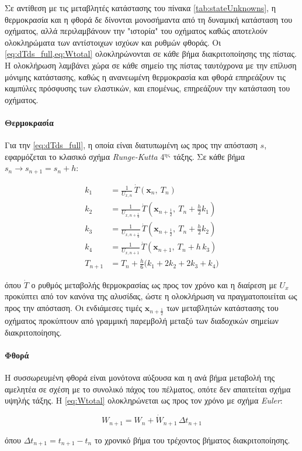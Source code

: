 Σε αντίθεση με τις μεταβλητές κατάστασης του πίνακα \ref{tab:stateUnknowns}, η θερμοκρασία και η φθορά δε δίνονται μονοσήμαντα από τη δυναμική κατάσταση του οχήματος, αλλά περιλαμβάνουν την "ιστορία" του οχήματος καθώς αποτελούν ολοκληρώματα των αντίστοιχων ισχύων και ρυθμών φθοράς. Οι \cref{eq:dTds_full,eq:Wtotal} ολοκληρώνονται σε κάθε βήμα διακριτοποίησης της πίστας. Η ολοκλήρωση λαμβάνει χώρα σε κάθε σημείο της πίστας ταυτόχρονα με την επίλυση μόνιμης κατάστασης, καθώς η ανανεωμένη θερμοκρασία και φθορά επηρεάζουν τις καμπύλες πρόσφυσης των ελαστικών, και επομένως, επηρεάζουν την κατάσταση του οχήματος.

\paragraph{Θερμοκρασία}
Για την \cref{eq:dTds_full}, η οποία είναι διατυπωμένη ως προς την απόσταση $s$, εφαρμόζεται το κλασικό σχήμα \textit{Runge-Kutta} 4$^{\text{ης}}$ τάξης. Σε κάθε βήμα $s_n \rightarrow s_{n+1} = s_n + h$:

\begin{equation}
    \begin{aligned}
        k_1 &= \frac{1}{U_{x,n}}\,\dot{T}\!\left(\mathbf{x}_n,\ T_n\right)\\[2pt]
        k_2 &= \frac{1}{U_{x,n+\frac{1}{2}}}\,\dot{T}\!\left(\mathbf{x}_{n+\frac{1}{2}},\ T_n + \tfrac{h}{2}k_1\right)\\[2pt]
        k_3 &= \frac{1}{U_{x,n+\frac{1}{2}}}\,\dot{T}\!\left(\mathbf{x}_{n+\frac{1}{2}},\ T_n + \tfrac{h}{2}k_2\right)\\[2pt]
        k_4 &= \frac{1}{U_{x,n+1}}\,\dot{T}\!\left(\mathbf{x}_{n+1},\ T_n + h\,k_3\right)\\[2pt]
        T_{n+1} &= T_n + \frac{h}{6}\bigl(k_1 + 2k_2 + 2k_3 + k_4\bigr)
    \end{aligned}
    \label{eq:rk4Temperature}
\end{equation}

\noindent
όπου $\dot{T}$ ο ρυθμός μεταβολής θερμοκρασίας ως προς τον χρόνο και η διαίρεση με $U_x$ προκύπτει από τον κανόνα της αλυσίδας, ώστε η ολοκλήρωση να πραγματοποιείται ως προς την απόσταση. Οι ενδιάμεσες τιμές $\mathbf{x}_{n+\frac{1}{2}}$ των μεταβλητών κατάστασης του οχήματος προκύπτουν από γραμμική παρεμβολή μεταξύ των διαδοχικών σημείων διακριτοποίησης.

\paragraph{Φθορά}
Η συσσωρευμένη φθορά είναι μονότονα αύξουσα και η ανά βήμα μεταβολή της αμελητέα σε σχέση με το συνολικό πάχος του πέλματος, οπότε δεν απαιτείται σχήμα υψηλής τάξης. Η \cref{eq:Wtotal} ολοκληρώνεται ως προς τον χρόνο με σχήμα \textit{Euler}:

\begin{equation}
    W_{n+1} = W_n + \dot{W}_{n+1}\,\Delta t_{n+1}
    \label{eq:eulerWear}
\end{equation}

\noindent
όπου $\Delta t_{n+1} = t_{n+1} - t_n$ το χρονικό βήμα του τρέχοντος βήματος διακριτοποίησης.